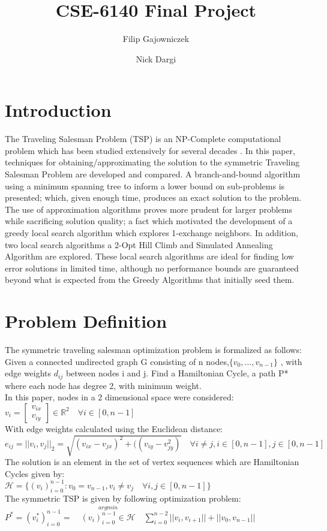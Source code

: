 \documentclass[format=sigconf]{acmart}
\begin{document}
\title{CSE-6140 Final Project}
\author{Filip Gajowniczek}
\author{Nick Dargi}


\section{Introduction}
The Traveling Salesman Problem (TSP) is an NP-Complete computational problem which has been studied extensively for several decades \cite{laporte_1992}. In this paper, techniques for obtaining/approximating the solution to the symmetric Traveling Salesman Problem are developed and compared. 
A branch-and-bound algorithm using a minimum spanning tree to inform a lower bound on sub-problems is presented; which, given enough time, produces an exact solution to the problem. The use of approximation algorithms proves more prudent for larger problems while sacrificing solution quality; a fact which motivated the development of a greedy local search algorithm which explores 1-exchange neighbors. 
In addition, two local search algorithms a 2-Opt Hill Climb and Simulated Annealing Algorithm are explored. These local search algorithms are ideal for finding low error solutions in limited time, although no performance bounds are guaranteed beyond what is expected from the Greedy Algorithms that initially seed them. 
\section*{Problem Definition}
The symmetric traveling salesman optimization problem is formalized as follows:\\
Given a connected undirected graph G consisting of n nodes,$\{v_0, \hdots, v_{n-1}\}$ , with edge weights $d_{ij}$ between nodes i and j.
Find a Hamiltonian Cycle, a path P* where each node has degree 2, with minimum weight.\\
In this paper, nodes in a 2 dimensional space were considered: $v_i = \begin{bmatrix}
v_{ix} \\ v_{iy} 
\end{bmatrix} \in \mathbb{R}^2 \quad \forall i \in [0,n-1]$\\
With edge weights calculated using the Euclidean distance: $e_{ij} = || v_i, v_j ||_2 = \sqrt{(v_{ix}-v_{jx})^2 + ((v_{iy}-v_{jy}^2)} \quad \forall i\neq j, i \in [0,n-1], j \in [0,n-1]$\\
The solution is an element in the set of vertex sequences which are Hamiltonian Cycles given by:\\
$\mathcal{H} = \{ (v_i)_{i=0}^{n-1} : v_0 = v_{n-1}, v_i \neq v_j \quad \forall i,j \in [0,n-1]\}$\\
The symmetric TSP is given by following optimization problem:\\ 
$P^*=(v^*_i)_{i=0}^{n-1} =\quad  \stackrel{argmin}{(v_i)_{i=0}^{n-1} \in \mathcal{H}} \quad \sum_{i=0}^{n-2} ||v_i, v_{i+1} || + ||v_0, v_{n-1} || $
\end{document}
